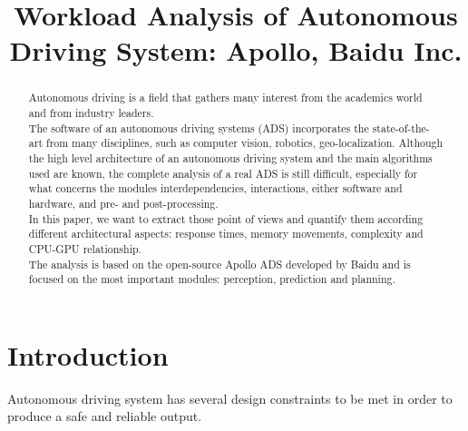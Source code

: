 \documentclass[conference]{IEEEtran}
\begin{document}
\title{Workload Analysis of Autonomous Driving System: Apollo, Baidu Inc.}

\author{
\and
{}
\and
{}
}
\maketitle

\begin{abstract}
    Autonomous driving is a field that gathers many interest from the academics world and from industry leaders.\\
    The software of an autonomous driving systems (ADS) incorporates the state-of-the-art from many disciplines, such as computer vision, robotics, geo-localization.
    Although the high level architecture of an autonomous driving system and the main algorithms used are known, the complete analysis of a real ADS is still difficult, especially for what concerns the modules interdependencies, interactions, either software and hardware, and pre- and post-processing.\\
    In this paper, we want to extract those point of views and quantify them according different architectural aspects: response times, memory movements, complexity and CPU-GPU relationship.\\
    The analysis is based on the open-source Apollo ADS developed by Baidu and is focused on the most important modules: perception, prediction and planning.
\end{abstract}

\section{Introduction}
Autonomous driving system has several design constraints \cite{b1} to be met in order to produce a safe and reliable output.
\end{document}
